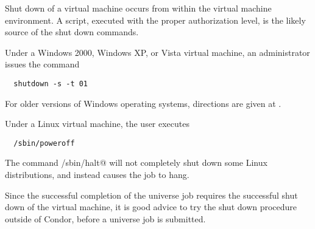 Shut down of a virtual machine occurs from within the virtual
machine environment.
A script, executed with the proper authorization level,
is the likely source of the shut down commands.

Under a Windows 2000, Windows XP, or Vista virtual machine,
an administrator issues the command
\begin{verbatim}
  shutdown -s -t 01
\end{verbatim}
For older versions of Windows operating systems, 
directions are given at
.

Under a Linux virtual machine,
the  user executes
\begin{verbatim}
  /sbin/poweroff
\end{verbatim}
The command \verb@/sbin/halt@ will not completely
shut down some Linux distributions, and instead
causes the job to hang.

Since the successful completion of the  universe job
requires the successful shut down of the virtual machine,
it is good advice to try the shut down procedure outside of
Condor, before a  universe job is submitted.


